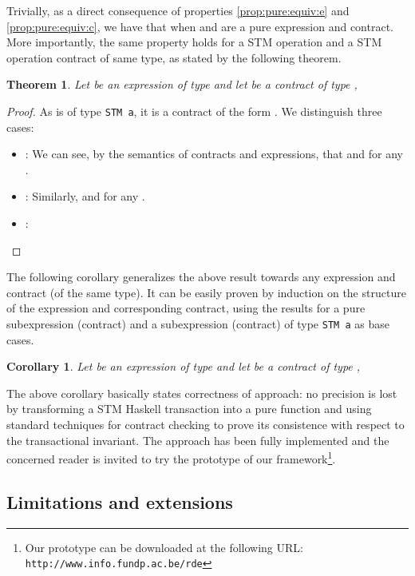 \documentclass[submission,copyright,creativecommons]{eptcs}
\newtheorem{theorem}{Theorem}
\newtheorem{corollary}{Corollary}
\begin{document}
Trivially, as a direct consequence of properties \eqref{prop:pure:equiv:e} and \eqref{prop:pure:equiv:c}, we have that  when  and  are a pure expression and contract. 
More importantly, the same property holds for a STM operation and a STM operation contract of same type, as stated by the following theorem.
\begin{theorem}
Let  be an expression of type  and let  be a contract of type , 

\end{theorem}
\begin{proof}
As  is of type \texttt{STM a}, it is a contract of the form . We distinguish three cases:
\begin{itemize}
\item  : 
We can see, by the semantics of contracts and expressions, that  and  for any . 
\item  : 
Similarly,  and  for any . 
\item  : \medskip\\
  
\end{itemize}
\end{proof}

The following corollary generalizes the above result towards any expression and contract (of the same type). It can be easily proven by induction on the structure of the expression and corresponding contract, using the results for a pure subexpression (contract) and a subexpression (contract) of type \texttt{STM a} as base cases.
\begin{corollary}
  Let  be an expression of type  and let  be a contract of type , 
  
\end{corollary}

The above corollary basically states correctness of approach: no precision is lost by transforming a STM Haskell transaction into a pure function and using standard techniques for contract checking \cite{static-contract-checking} to prove its consistence with respect to the transactional invariant. The approach has been fully implemented and the concerned reader is invited to try the prototype of our framework\footnote{Our prototype can be  downloaded at the following URL: \\ \texttt{http://www.info.fundp.ac.be/rde}}.   



\subsection{Limitations and extensions}
\label{discussion}
\end{document}
